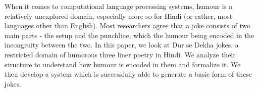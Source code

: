 When it comes to computational language processing systems, humour is a relatively unexplored domain, especially more so for Hindi (or rather, most languages other than English). Most researchers agree that a joke consists of two main parts - the setup and the punchline, which the humour being encoded in the incongruity between the two. In this paper, we look at Dur se Dekha jokes, a restricted domain of humorous three liner poetry in Hindi. We analyze their structure to understand how humour is encoded in them and formalize it. We then develop a system which is successfully able to generate a basic form of these jokes.
